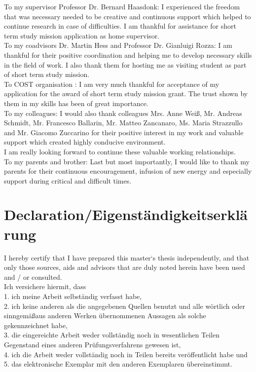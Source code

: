 \documentclass[a4paper,twoside,openright]{book}
\begin{document}
To my supervisor Professor Dr. Bernard Haasdonk: I experienced the freedom that was necessary needed to be creative and continuous support which helped to continue research in case of difficulties. I am thankful for assistance for short term study mission application as home supervisor.\\

To my coadvisors Dr. Martin Hess and Professor Dr. Gianluigi Rozza: I am thankful for their positive coordination and helping me to develop necessary skills in the field of work. I also thank them for hosting me as visiting student as part of short term study mission.\\

To COST organisation : I am very much thankful for acceptance of my application for the award of short term study mission grant. The trust shown by them in my skills has been of great importance.\\

To my colleagues: I would also thank colleagues Mrs. Anne Wei\ss, Mr. Andreas Schmidt, Mr. Francesco Ballarin, Mr. Matteo Zancanaro, Ms. Maria Strazzullo and Mr. Giacomo Zuccarino for their positive interest in my work and valuable support which created highly conducive environment.\\

I am really looking forward to continue these valuable working relationships.\\

To my parents and brother: Last but most importantly, I would like to thank my parents for their continuous encouragement, infusion of new energy and especially support during critical and difficult times.\\

\newpage

\section{Declaration/Eigenst\"andigkeitserkl\"arung}

I hereby certify that I have prepared this master‘s thesis independently, and that only those sources, aids and advisors that are duly noted herein have been used and / or consulted.\\

\noindent
Ich versichere hiermit, dass\\
1. ich meine Arbeit selbst\"andig verfasst habe,\\
2. ich keine anderen als die angegebenen Quellen benutzt und alle w\"ortlich oder
sinngem\"a\ss \space aus anderen Werken \"ubernommenen Aussagen als solche gekennzeichnet habe,\\
3. die eingereichte Arbeit weder vollst\"andig noch in wesentlichen Teilen
Gegenstand eines anderen Prüfungsverfahrens gewesen ist,\\
4. ich die Arbeit weder vollst\"andig noch in Teilen bereits veröffentlicht habe und\\
5. das elektronische Exemplar mit den anderen Exemplaren \"ubereinstimmt.\\
\end{document}
